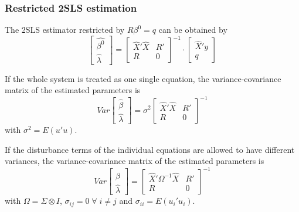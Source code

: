 \documentclass[article]{jss}
\begin{document}
\subsubsection{Restricted 2SLS estimation}

The 2SLS estimator restricted by $R \beta^0 = q$ can be obtained by
\begin{equation}
   \left[ \begin{array}{c}
      \widehat{\beta^0} \\ \widehat{\lambda}
   \end{array} \right]
   =
   \left[ \begin{array}{cc}
      \widehat{X}' \widehat{X} & R' \\ 
      R & 0
   \end{array} \right]^{-1}
   \cdot
   \left[ \begin{array}{c}
      \widehat{X}' y \\ q 
   \end{array} \right]
   \label{eq:beta2SLSr}
\end{equation}

If the whole system is treated as one single equation, 
the variance-covariance matrix of the estimated parameters is
\begin{equation}
   Var 
   \left[ \begin{array}{c}
      \widehat{\beta} \\ \widehat{\lambda}
   \end{array} \right] 
   = \sigma^2 
   \left[ \begin{array}{cc}
      \widehat{X}' \widehat{X} & R' \\ 
      R & 0
   \end{array} \right]^{-1}
\end{equation}
with $\sigma^2 = E \left( u' u \right)$.

If the disturbance terms of the individual equations 
are allowed to have different variances, 
the variance-covariance matrix of the estimated parameters is
\begin{equation}
   Var 
   \left[ \begin{array}{c}
      \widehat{\beta} \\ \widehat{\lambda}
   \end{array} \right] 
   = 
   \left[ \begin{array}{cc}
      \widehat{X}' \Omega^{-1} \widehat{X} & R' \\ 
      R & 0
   \end{array} \right]^{-1}
\end{equation}
with $\Omega = \Sigma \otimes I$, 
$\sigma_{ij} = 0 \; \forall \; i \neq j$ and
$\sigma_{ii} = E \left( u_i' u_i \right)$.
\end{document}
